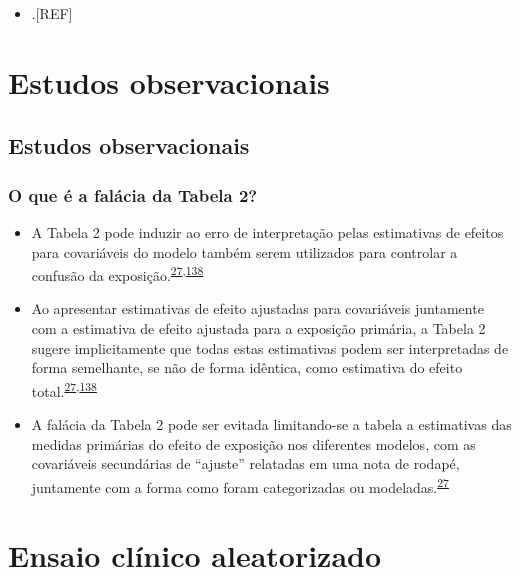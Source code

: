 \documentclass[
  a4paper,
]{book}
\providecommand{\tightlist}{%
  \setlength{\itemsep}{0pt}\setlength{\parskip}{0pt}}
\begin{document}
\begin{itemize}
\tightlist
\item
  .{[}REF{]}
\end{itemize}

\hypertarget{estudos-observacionais}{%
\chapter{\texorpdfstring{\textbf{Estudos observacionais}}{Estudos observacionais}}\label{estudos-observacionais}}

\hypertarget{observacionais}{%
\section{Estudos observacionais}\label{observacionais}}

\hypertarget{o-que-uxe9-a-faluxe1cia-da-tabela-2}{%
\subsection{O que é a falácia da Tabela 2?}\label{o-que-uxe9-a-faluxe1cia-da-tabela-2}}

\begin{itemize}
\item
  A Tabela 2 pode induzir ao erro de interpretação pelas estimativas de efeitos para covariáveis do modelo também serem utilizados para controlar a confusão da exposição.\textsuperscript{\protect\hyperlink{ref-Westreich2013}{27},\protect\hyperlink{ref-bandoli2018}{138}}
\item
  Ao apresentar estimativas de efeito ajustadas para covariáveis juntamente com a estimativa de efeito ajustada para a exposição primária, a Tabela 2 sugere implicitamente que todas estas estimativas podem ser interpretadas de forma semelhante, se não de forma idêntica, como estimativa do efeito total.\textsuperscript{\protect\hyperlink{ref-Westreich2013}{27},\protect\hyperlink{ref-bandoli2018}{138}}
\item
  A falácia da Tabela 2 pode ser evitada limitando-se a tabela a estimativas das medidas primárias do efeito de exposição nos diferentes modelos, com as covariáveis secundárias de ``ajuste'' relatadas em uma nota de rodapé, juntamente com a forma como foram categorizadas ou modeladas.\textsuperscript{\protect\hyperlink{ref-Westreich2013}{27}}
\end{itemize}

\hypertarget{ensaio-cluxednico-aleatorizado}{%
\chapter{\texorpdfstring{\textbf{Ensaio clínico aleatorizado}}{Ensaio clínico aleatorizado}}\label{ensaio-cluxednico-aleatorizado}}
\end{document}

